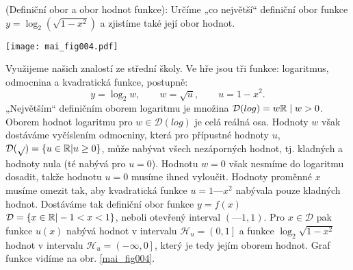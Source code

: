 \wikitextrule
\begin{example}\label{fyz:fey_exam017}
  (Definiční obor a obor hodnot funkce): Určíme „co největší“ definiční obor funkce 
  \(y=\log_2{(\sqrt{1-x^2})}\) a zjistíme také její obor hodnot.
      
  {\centering
   \captionsetup{type=figure}
%   
   \texttt{[image: mai\_fig004.pdf]}
  \par}
  
  Využijeme našich znalostí ze střední školy. Ve hře jsou tři funkce: logaritmus, odmocnina a 
  kvadratická funkce, postupně: 
  \begin{equation*}
    y = \log_2w, \qquad w = \sqrt{u}, \qquad u = 1 - x^2.
  \end{equation*}
  „Největším“ definičním oborem logaritmu je množina \(\mathcal{D}(log) = {w\mathbb{R} \mid w > 0}\).
  Oborem hodnot logaritmu pro \(w \in \mathcal{D}(log)\) je celá reálná osa. Hodnoty \(w\) však 
  dostáváme vyčíslením odmocniny, která pro přípustné hodnoty \(u\), \(\mathcal{D}(\sqrt{ }) = 
  \lbrace u\in\mathbb{R} | u\geq 0\rbrace\), může nabývat všech nezáporných hodnot, tj. kladných a 
  hodnoty nula (té nabývá pro \(u = 0\)). Hodnotu \(w = 0\) však nesmíme do logaritmu dosadit, 
  takže hodnotu \(u = 0\) musíme ihned vyloučit. Hodnoty proměnné \(x\) musíme omezit tak, aby 
  kvadratická funkce \(u = 1 — x^2\) nabývala pouze kladných hodnot. Dostáváme tak definiční obor 
  funkce \(y = f(x)\) \(\mathcal{D}=\lbrace x\in\mathbb{R} | -1<x<1\rbrace\), neboli otevřený 
  interval \((—1, 1)\). Pro \(x \in \mathcal{D}\) pak funkce \(u(x)\) nabývá hodnot v          
  intervalu \(\mathcal{H}_u = \left( 0, 1\right]\) a funkce \(\log_2\sqrt{1-x^2}\) hodnot v 
  intervalu \(\mathcal{H}_u = \left( -\infty, 0\right]\), který je tedy jejím oborem hodnot. Graf 
  funkce vidíme na obr. \ref{mai_fig004}. 
\end{example}